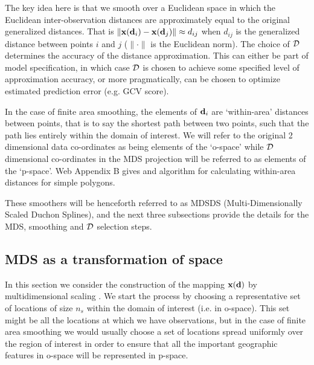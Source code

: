 \documentclass[smallextended]{svjour3}       %
\begin{document}
The key idea here is that we smooth over a Euclidean space  in which the Euclidean inter-observation distances are approximately equal to the original generalized distances. That is  $\|{\bf x}({\bf d}_i) - {\bf x}({\bf d}_j) \| \approx d_{ij}$ when $d_{ij}$ is the generalized distance between points $i$ and $j$ ($\|\cdot \|$ is the Euclidean norm). The choice of $\cal D$ determines the accuracy of the distance approximation. This can either be part of model specification, in which case $\cal D$ is chosen to achieve some specified level of approximation accuracy, or more pragmatically, can be chosen to optimize estimated prediction error (e.g. GCV score).

In the case of finite area smoothing, the elements of ${\bf d}_i$ are `within-area' distances between points, that is to say the shortest path between two points, such that the path lies entirely within the domain of interest. We will refer to the original 2 dimensional data co-ordinates as being elements of the `o-space' while $\cal D$ dimensional co-ordinates in the MDS projection will be referred to as elements of the `p-space'. Web Appendix B gives and algorithm for calculating within-area distances for simple polygons. 

These smoothers will be henceforth referred to as MDSDS (Multi-Dimensionally Scaled Duchon Splines), and the next three subsections provide the details for the MDS, smoothing and $\cal D$ selection steps.

\subsection{MDS as a transformation of space}

In this section we consider the construction of the mapping ${\bf x}({\bf d})$ by multidimensional scaling \citep[MDS;][]{Gower:1968to}. We start the process by choosing a representative set of locations of size $n_s$ within the domain of interest (i.e. in o-space). This set might be all the locations at which we have observations, but in the case of finite area smoothing we would usually choose a set of locations spread uniformly over the region of interest in order to ensure that all the important geographic features in o-space will be represented in p-space. 
\end{document}
